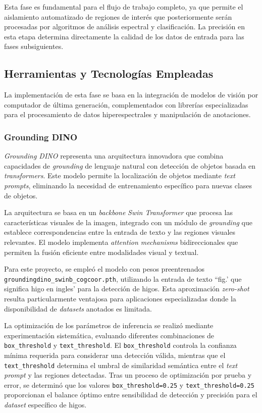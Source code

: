 Esta fase es fundamental para el flujo de trabajo completo, ya que permite el aislamiento automatizado de regiones de interés que posteriormente serán procesadas por algoritmos de análisis espectral y clasificación. La precisión en esta etapa determina directamente la calidad de los datos de entrada para las fases subsiguientes.

\subsection{Herramientas y Tecnologías Empleadas}

La implementación de esta fase se basa en la integración de modelos de visión por computador de última generación, complementados con librerías especializadas para el procesamiento de datos hiperespectrales y manipulación de anotaciones.

\subsubsection{Grounding DINO}

\emph{Grounding DINO} representa una arquitectura innovadora que combina capacidades de \emph{grounding} de lenguaje natural con detección de objetos basada en \emph{transformers}. Este modelo permite la localización de objetos mediante \emph{text prompts}, eliminando la necesidad de entrenamiento específico para nuevas clases de objetos.

La arquitectura se basa en un \emph{backbone} \emph{Swin Transformer} que procesa las características visuales de la imagen, integrado con un módulo de \emph{grounding} que establece correspondencias entre la entrada de texto y las regiones visuales relevantes. El modelo implementa \emph{attention mechanisms} bidireccionales que permiten la fusión eficiente entre modalidades visual y textual.

Para este proyecto, se empleó el modelo  con pesos preentrenados \texttt{groundingdino\_swinb\_cogcoor.pth}, utilizando la entrada de texto ``fig.' que significa higo en ingles' para la detección de higos. Esta aproximación \emph{zero-shot} resulta particularmente ventajosa para aplicaciones especializadas donde la disponibilidad de \emph{datasets} anotados es limitada.

La optimización de los parámetros de inferencia se realizó mediante experimentación sistemática, evaluando diferentes combinaciones de \texttt{box\_threshold} y \texttt{text\_threshold}. El \texttt{box\_threshold} controla la confianza mínima requerida para considerar una detección válida, mientras que el \texttt{text\_threshold} determina el umbral de similaridad semántica entre el \emph{text prompt} y las regiones detectadas. Tras un proceso de optimización por prueba y error, se determinó que los valores \texttt{box\_threshold=0.25} y \texttt{text\_threshold=0.25} proporcionan el balance óptimo entre sensibilidad de detección y precisión para el \emph{dataset} específico de higos.


